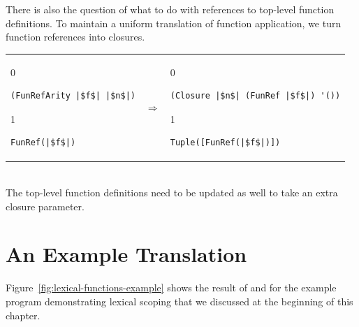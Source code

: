 \documentclass[7x10,nocrop]{TimesAPriori_MIT}%
\def\racketEd{0}
\def\pythonEd{1}
\def\edition{1}
\begin{document}
There is also the question of what to do with references to top-level
function definitions. To maintain a uniform translation of function
application, we turn function references into closures.

\begin{tabular}{lll}
\begin{minipage}{0.3\textwidth}
{\if\edition\racketEd
\begin{lstlisting}
(FunRefArity |$f$| |$n$|)
\end{lstlisting}
\fi}
{\if\edition\pythonEd
\begin{lstlisting}
FunRef(|$f$|)
\end{lstlisting}
\fi}
\end{minipage}
&
$\Rightarrow$
&
\begin{minipage}{0.5\textwidth}
{\if\edition\racketEd
\begin{lstlisting}
(Closure |$n$| (FunRef |$f$|) '())
\end{lstlisting}
\fi}
{\if\edition\pythonEd
\begin{lstlisting}
Tuple([FunRef(|$f$|)])
\end{lstlisting}
\fi}
\end{minipage}
\end{tabular}  \\
%
The top-level function definitions need to be updated as well to take
an extra closure parameter.

\section{An Example Translation}
\label{sec:example-lambda}

Figure~\ref{fig:lexical-functions-example} shows the result of
 and  for the example
program demonstrating lexical scoping that we discussed at the
beginning of this chapter.
\end{document}
